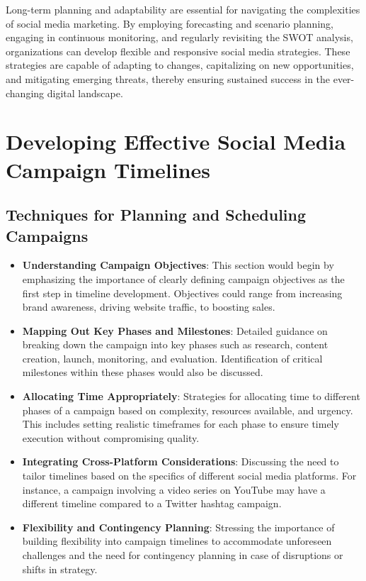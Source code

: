 \documentclass[
]{book}
\providecommand{\tightlist}{%
  \setlength{\itemsep}{0pt}\setlength{\parskip}{0pt}}
\begin{document}
Long-term planning and adaptability are essential for navigating the complexities of social media marketing. By employing forecasting and scenario planning, engaging in continuous monitoring, and regularly revisiting the SWOT analysis, organizations can develop flexible and responsive social media strategies. These strategies are capable of adapting to changes, capitalizing on new opportunities, and mitigating emerging threats, thereby ensuring sustained success in the ever-changing digital landscape.

\hypertarget{developing-effective-social-media-campaign-timelines}{%
\chapter{Developing Effective Social Media Campaign Timelines}\label{developing-effective-social-media-campaign-timelines}}

\hypertarget{techniques-for-planning-and-scheduling-campaigns}{%
\section*{Techniques for Planning and Scheduling Campaigns}\label{techniques-for-planning-and-scheduling-campaigns}}

\begin{itemize}
\tightlist
\item
  \textbf{Understanding Campaign Objectives}: This section would begin by emphasizing the importance of clearly defining campaign objectives as the first step in timeline development. Objectives could range from increasing brand awareness, driving website traffic, to boosting sales.
\item
  \textbf{Mapping Out Key Phases and Milestones}: Detailed guidance on breaking down the campaign into key phases such as research, content creation, launch, monitoring, and evaluation. Identification of critical milestones within these phases would also be discussed.
\item
  \textbf{Allocating Time Appropriately}: Strategies for allocating time to different phases of a campaign based on complexity, resources available, and urgency. This includes setting realistic timeframes for each phase to ensure timely execution without compromising quality.
\item
  \textbf{Integrating Cross-Platform Considerations}: Discussing the need to tailor timelines based on the specifics of different social media platforms. For instance, a campaign involving a video series on YouTube may have a different timeline compared to a Twitter hashtag campaign.
\item
  \textbf{Flexibility and Contingency Planning}: Stressing the importance of building flexibility into campaign timelines to accommodate unforeseen challenges and the need for contingency planning in case of disruptions or shifts in strategy.
\end{itemize}
\end{document}
